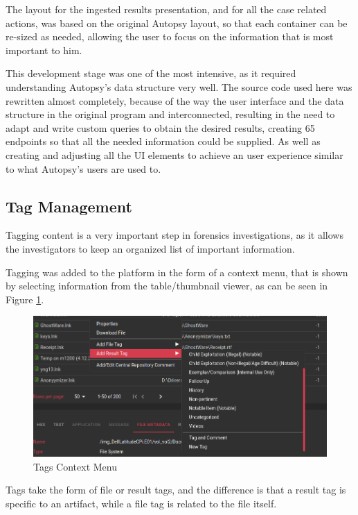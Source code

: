 The layout for the ingested results presentation, and for all the case related actions, was based on the original Autopsy layout, so that each container can be re-sized as
needed, allowing the user to focus on the information that is most important to him.

This development stage was one of the most intensive, as it required understanding Autopsy's data structure very well. The source code used here was rewritten almost completely, 
because of the way the user interface and the data structure in the original program and interconnected, resulting in the need to adapt and write custom queries to obtain the desired results, creating 
65 endpoints so that all the needed information could be supplied. As well as creating and adjusting all the UI elements to achieve an user experience similar to what Autopsy's users are used to.

\subsection{Tag Management}

Tagging content is a very important step in forensics investigations, as it allows the investigators to keep an organized list of important information.

Tagging was added to the platform in the form of a context menu, that is shown by selecting information from the table/thumbnail viewer, as can be seen in Figure \ref{fig:tags}.

\begin{figure}[ht]
 \centering
 \includegraphics[width=1\linewidth]{imgs/tags.png}
 \caption{Tags Context Menu}
 \label{fig:tags}
\end{figure}

Tags take the form of file or result tags, and the difference is that a result tag is specific to an artifact, while a file tag is related to the file itself.


